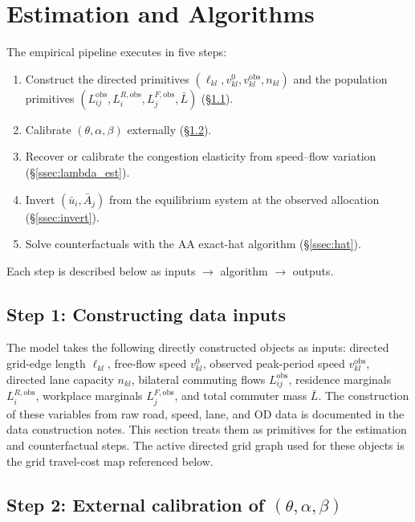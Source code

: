 \documentclass[12pt]{article}
\newcommand{\Lbar}{\bar L}
\newcommand{\ubar}{\bar u}
\newcommand{\Abar}{\bar A}
\newcommand{\obs}{\mathrm{obs}}
\begin{document}
\section{Estimation and Algorithms}\label{sec:est}

The empirical pipeline executes in five steps:
\begin{enumerate}[label=\textbf{Step \arabic*.},leftmargin=3.5em,itemsep=0.2em]
\item Construct the directed primitives
  $(\ell_{kl},v^{0}_{kl},v_{kl}^{\obs},n_{kl})$ and the population
  primitives $(L_{ij}^{\obs},L_i^{R,\obs},L_j^{F,\obs},\Lbar)$
  (\S\ref{ssec:data_construction}).
\item Calibrate $(\theta,\alpha,\beta)$ externally
  (\S\ref{ssec:calibration}).
\item Recover or calibrate the congestion elasticity from speed--flow
  variation
  (\S\ref{ssec:lambda_est}).
\item Invert $(\ubar_i,\Abar_j)$ from the equilibrium system at the
  observed allocation (\S\ref{ssec:invert}).
\item Solve counterfactuals with the AA exact-hat algorithm
  (\S\ref{ssec:hat}).
\end{enumerate}
Each step is described below as inputs $\to$ algorithm $\to$ outputs.

\subsection{Step 1: Constructing data inputs}\label{ssec:data_construction}

The model takes the following directly constructed objects as inputs:
directed grid-edge length $\ell_{kl}$, free-flow speed $v_{kl}^{0}$,
observed peak-period speed $v_{kl}^{\obs}$, directed lane capacity
$n_{kl}$, bilateral commuting flows $L_{ij}^{\obs}$, residence
marginals $L_i^{R,\obs}$, workplace marginals $L_j^{F,\obs}$, and
total commuter mass $\Lbar$.  The construction of these variables
from raw road, speed, lane, and OD data is documented in the data
construction notes.  This section treats them as primitives for the
estimation and counterfactual steps.  The active directed grid graph
used for these objects is the grid travel-cost map referenced below.
\label{ssec:rawgrid_step}

\subsection{Step 2: External calibration of $(\theta,\alpha,\beta)$}
\label{ssec:calibration}
\end{document}
